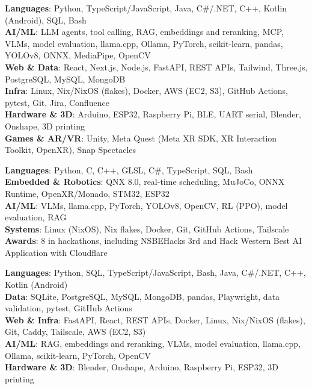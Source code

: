 \small{\item{
    \textbf{Languages}{: Python, TypeScript/JavaScript, Java, C\#/.NET, C++, Kotlin (Android), SQL, Bash} \\
    \textbf{AI/ML}{: LLM agents, tool calling, RAG, embeddings and reranking, MCP, VLMs, model evaluation, llama.cpp, Ollama, PyTorch, scikit-learn, pandas, YOLOv8, ONNX, MediaPipe, OpenCV} \\
    \textbf{Web \& Data}{: React, Next.js, Node.js, FastAPI, REST APIs, Tailwind, Three.js, PostgreSQL, MySQL, MongoDB} \\
    \textbf{Infra}{: Linux, Nix/NixOS (flakes), Docker, AWS (EC2, S3), GitHub Actions, pytest, Git, Jira, Confluence} \\
    \textbf{Hardware \& 3D}{: Arduino, ESP32, Raspberry Pi, BLE, UART serial, Blender, Onshape, 3D printing} \\
    \textbf{Games \& AR/VR}{: Unity, Meta Quest (Meta XR SDK, XR Interaction Toolkit, OpenXR), Snap Spectacles}
}}

\small{\item{
    \textbf{Languages}{: Python, C, C++, GLSL, C\#, TypeScript, SQL, Bash} \\
    \textbf{Embedded \& Robotics}{: QNX 8.0, real-time scheduling, MuJoCo, ONNX Runtime, OpenXR/Monado, STM32, ESP32} \\
    \textbf{AI/ML}{: VLMs, llama.cpp, PyTorch, YOLOv8, OpenCV, RL (PPO), model evaluation, RAG} \\
    \textbf{Systems}{: Linux (NixOS), Nix flakes, Docker, Git, GitHub Actions, Tailscale} \\
    \textbf{Awards}{: 8 in \NHackathons{} hackathons, including NSBEHacks 3rd and Hack Western Best AI Application with Cloudflare}
}}

\small{\item{
    \textbf{Languages}{: Python, SQL, TypeScript/JavaScript, Bash, Java, C\#/.NET, C++, Kotlin (Android)} \\
    \textbf{Data}{: SQLite, PostgreSQL, MySQL, MongoDB, pandas, Playwright, data validation, pytest, GitHub Actions} \\
    \textbf{Web \& Infra}{: FastAPI, React, REST APIs, Docker, Linux, Nix/NixOS (flakes), Git, Caddy, Tailscale, AWS (EC2, S3)} \\
    \textbf{AI/ML}{: RAG, embeddings and reranking, VLMs, model evaluation, llama.cpp, Ollama, scikit-learn, PyTorch, OpenCV} \\
    \textbf{Hardware \& 3D}{: Blender, Onshape, Arduino, Raspberry Pi, ESP32, 3D printing}
}}
